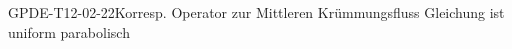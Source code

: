 
\begin{EXA}{GPDE-T12-02-22}{Korresp. Operator zur Mittleren Krümmungsfluss Gleichung ist uniform parabolisch}
\end{EXA}
